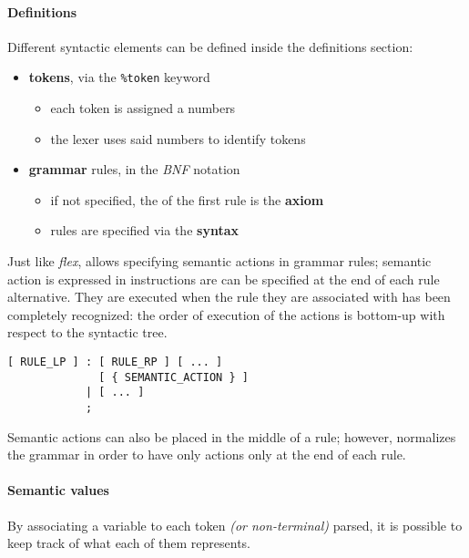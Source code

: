 \paragraph*{Definitions}
Different syntactic elements can be defined inside the definitions section:
\begin{itemize}
  \item \textbf{tokens}, via the \texttt{\%token} keyword
        \begin{itemize}
          \item each token is assigned a numbers
          \item the lexer uses said numbers to identify tokens
        \end{itemize}
  \item \textbf{grammar} rules, in the \textit{BNF} notation
        \begin{itemize}
          \item if not specified, the \LP of the first rule is the \textbf{axiom}
          \item rules are specified via the \textbf{syntax}
        \end{itemize}
\end{itemize}

Just like \textit{flex}, \bison allows specifying semantic actions in grammar rules;
semantic action is expressed in \clang instructions are can be specified at the end of each rule alternative.
They are executed when the rule they are associated with has been completely recognized:
the order of execution of the actions is bottom-up with respect to the syntactic tree.

\begin{onepage}
  \begin{lstlisting}[caption={Definition section of a \bison file}, label={lst:bison-definition-section}]
[ RULE_LP ] : [ RULE_RP ] [ ... ]
              [ { SEMANTIC_ACTION } ]
            | [ ... ]
            ;
\end{lstlisting}
\end{onepage}

Semantic actions can also be placed in the middle of a rule;
however, \bison normalizes the grammar in order to have only actions only at the end of each rule.

\paragraph*{Semantic values}

By associating a variable to each token \textit{(or non-terminal)} parsed, it is possible to keep track of what each of them represents.

